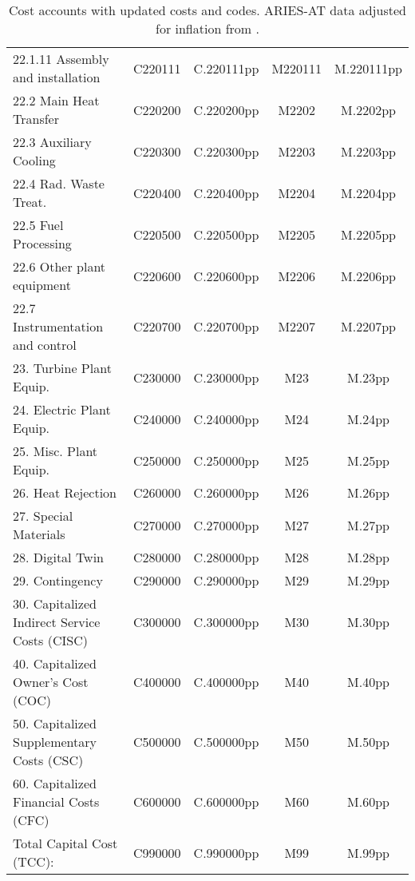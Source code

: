 \begin{table}[h!]
{\begin{tabular}{lcccc}
\hspace{15mm}22.1.11 Assembly and installation & C220111 & C.220111pp & M220111 & M.220111pp \\
\hspace{10mm}22.2 Main Heat Transfer & C220200 & C.220200pp & M2202 & M.2202pp \\
\hspace{10mm}22.3 Auxiliary Cooling & C220300 & C.220300pp & M2203 & M.2203pp \\
\hspace{10mm}22.4 Rad. Waste Treat. & C220400 & C.220400pp & M2204 & M.2204pp \\
\hspace{10mm}22.5 Fuel Processing & C220500 & C.220500pp & M2205 & M.2205pp \\
\hspace{10mm}22.6 Other plant equipment & C220600 & C.220600pp & M2206 & M.2206pp \\
\hspace{10mm}22.7 Instrumentation and control & C220700 & C.220700pp & M2207 & M.2207pp \\
\hspace{5mm}23. Turbine Plant Equip. & C230000 & C.230000pp & M23 & M.23pp \\
\hspace{5mm}24. Electric Plant Equip. & C240000 & C.240000pp & M24 & M.24pp \\
\hspace{5mm}25. Misc. Plant Equip. & C250000 & C.250000pp & M25 & M.25pp \\
\hspace{5mm}26. Heat Rejection & C260000 & C.260000pp & M26 & M.26pp \\
\hspace{5mm}27. Special Materials & C270000 & C.270000pp & M27 & M.27pp \\
\hspace{5mm}28. Digital Twin & C280000 & C.280000pp & M28 & M.28pp \\
\hspace{5mm}29. Contingency & C290000 & C.290000pp & M29 & M.29pp \\
30. Capitalized Indirect Service Costs (CISC) & C300000 & C.300000pp & M30 & M.30pp \\
40. Capitalized Owner’s Cost (COC) & C400000 & C.400000pp & M40 & M.40pp \\
50. Capitalized Supplementary Costs (CSC) & C500000 & C.500000pp & M50 & M.50pp \\
60. Capitalized Financial Costs (CFC) & C600000 & C.600000pp & M60 & M.60pp \\
\hline
Total Capital Cost (TCC): & C990000 & C.990000pp & M99 & M.99pp \\
\hline
\end{tabular}
}
\caption{Cost accounts with updated costs and codes. ARIES-AT data adjusted for inflation from \cite{gordon1986mirror}.}
\label{tab:costs_updated_codes}
\end{table}


